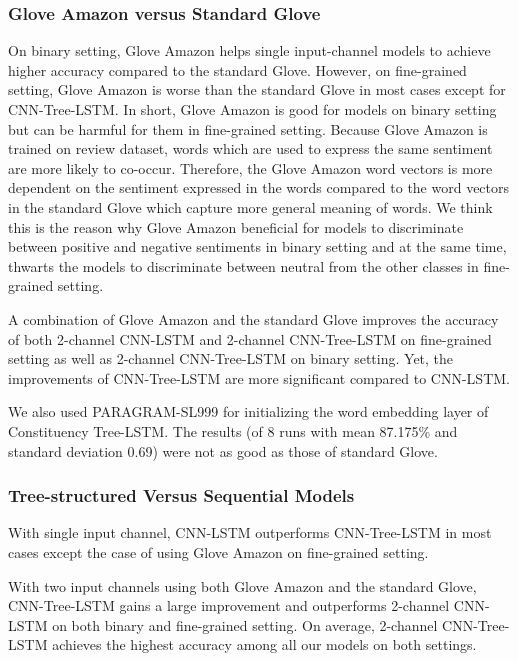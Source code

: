 \subsubsection{Glove Amazon versus Standard Glove}
On binary setting, Glove Amazon helps single input-channel models to achieve higher accuracy compared to the standard Glove.
However, on fine-grained setting, Glove Amazon is worse than the standard Glove in most cases except for CNN-Tree-LSTM.
In short, Glove Amazon is good for models on binary setting but can be harmful for them in fine-grained setting.
Because Glove Amazon is trained on review dataset, words which are used to express the same sentiment are more likely to co-occur. 
Therefore, the Glove Amazon word vectors is more dependent on the sentiment expressed in the words compared to the word vectors in the standard Glove which capture more general meaning of words.
We think this is the reason why Glove Amazon beneficial for models to discriminate between positive and negative sentiments in binary setting and at the same time, thwarts the models to discriminate between neutral from the other classes in fine-grained setting. 

A combination of Glove Amazon and the standard Glove improves the accuracy of both 2-channel CNN-LSTM and 2-channel CNN-Tree-LSTM on fine-grained setting as well as 2-channel CNN-Tree-LSTM on binary setting.
Yet, the improvements of CNN-Tree-LSTM are more significant compared to CNN-LSTM.

We also used PARAGRAM-SL999 for initializing the word embedding layer of Constituency Tree-LSTM.
The results (of 8 runs with mean 87.175\% and standard deviation 0.69) were not as good as those of standard Glove.
\subsubsection{Tree-structured Versus Sequential Models}
With single input channel, CNN-LSTM outperforms CNN-Tree-LSTM in most cases except the case of using Glove Amazon on fine-grained setting.

With two input channels using both Glove Amazon and the standard Glove, CNN-Tree-LSTM gains a large improvement and outperforms 2-channel CNN-LSTM on both binary and fine-grained setting.
On average, 2-channel CNN-Tree-LSTM achieves the highest accuracy among all our models on both settings.

